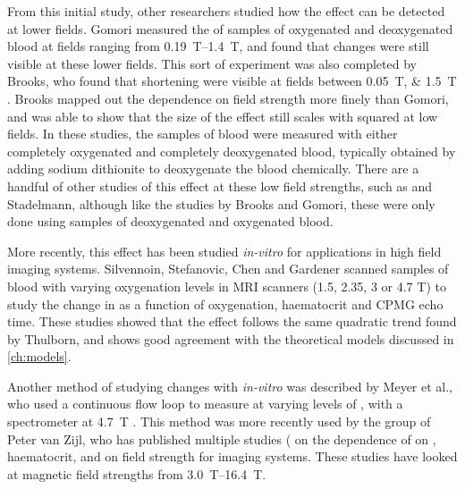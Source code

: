 From this initial study, other researchers studied how the effect can be detected at lower fields.
Gomori measured the \Ttwo of samples of oxygenated and deoxygenated blood at fields ranging from \SIrange{0.19}{1.4}{T}, and found that changes were still visible at these lower fields\cite{GomoriNMRRelaxationTimes1987}.
This sort of experiment was also completed by Brooks, who found that \Ttwo shortening were visible at fields between \SIlist{0.05;1.5}{T} \cite{BrooksComparisont2relaxation1995}.
Brooks mapped out the dependence on field strength more finely than Gomori, and was able to show that the size of the effect still scales with \Bzero squared at low fields.
In these studies, the samples of blood were measured with either completely oxygenated and completely deoxygenated blood, typically obtained by adding sodium dithionite to deoxygenate the blood chemically.
There are a handful of other studies of this effect at these low field strengths, such as \cite{BryantMagneticrelaxationblood1990} and Stadelmann\cite{StadelmannRelaxationtimesvenous1991}, although like the studies by Brooks and Gomori, these were only done using samples of deoxygenated and oxygenated blood.

More recently, this effect has been studied \textit{in-vitro} for applications in high field imaging systems.
Silvennoin\cite{SilvennoinenComparisondependenceblood2003}, Stefanovic\cite{StefanovicHumanwholebloodrelaxometry2004}, Chen\cite{ChenHumanwholeblood2009} and Gardener\cite{GardenerDependencebloodR22010} scanned samples of blood with varying oxygenation levels in MRI scanners (1.5, 2.35, 3 or 4.7 T) to study the change in \Ttwo as a function of oxygenation, haematocrit and CPMG echo time.
These studies showed that the effect follows the same quadratic trend found by Thulborn, and shows good agreement with the theoretical models discussed in \autoref{ch:models}.

Another method of studying \Ttwo changes with \SOtwo \textit{in-vitro} was described by Meyer et al., who used a continuous flow loop to measure \Ttwo at varying levels of \SOtwo, with a spectrometer at \SI{4.7}{T} \cite{MeyerNMRrelaxationrates1995}.
This method was more recently used by the group of Peter van Zijl, who has published multiple studies (\cite{ZhaoOxygenationhematocritdependence2007,GrgacTransversewaterrelaxation2017,QinDeterminationwholebrainoxygen2011} on the dependence of \Ttwo on \SOtwo, haematocrit, and on field strength for imaging systems.
These studies have looked at magnetic field strengths from \SIrange{3.0}{16.4}{T}.


